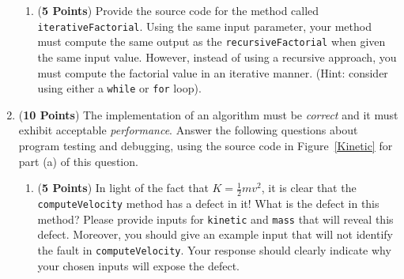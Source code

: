 \documentclass[12pt]{article}
\begin{document}
\begin{enumerate}
\begin{enumerate}

\item ({\bf 5 Points}) Provide the source code for the method called
  {\tt iterativeFactorial}.  Using the same input parameter, your
  method must compute the same output as the {\tt recursiveFactorial}
  when given the same input value.  However, instead of using a
  recursive approach, you must compute the factorial value in an
  iterative manner.  (Hint: consider using either a {\tt while} or
  {\tt for} loop).


\end{enumerate}

\newpage


\item ({\bf 10 Points}) The implementation of an algorithm must be
  {\em correct} and it must exhibit acceptable {\em performance}.
  Answer the following questions about program testing and debugging,
  using the source code in Figure~\ref{Kinetic} for part (a) of this
  question.

\begin{enumerate}
  
\item ({\bf 5 Points}) In light of the fact that $K =
  \frac{1}{2}mv^2$, it is clear that the {\tt computeVelocity} method
  has a defect in it!  What is the defect in this method?  Please
  provide inputs for {\tt kinetic} and {\tt mass} that will reveal
  this defect.  Moreover, you should give an example input that will
  not identify the fault in {\tt computeVelocity}.  Your response
  should clearly indicate why your chosen inputs will expose the
  defect.


\end{enumerate}
\end{enumerate}
\end{document}
